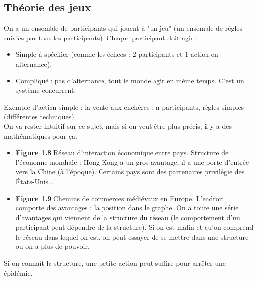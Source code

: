 \subsection{Théorie des jeux}
On a un ensemble de participants qui jouent à "un jeu" (un ensemble de règles suivies par tous les participants). Chaque participant doit agir : 
\begin{itemize}

\item Simple à spécifier (comme les échecs : 2 participants et 1 action en alternance). 
\item Compliqué : pas d'alternance, tout le monde agit en même temps. C'est un système concurrent.
\end{itemize}
Exemple d'action simple : la vente aux enchères : 
	n participants,
	règles simples (différentes techniques) \\
	
On va rester intuitif sur ce sujet, mais si on veut être plus précis, il y a des mathématiques pour ça.
\begin{itemize}

\item \textbf{Figure 1.8} Réseau d'interaction économique entre pays. Structure de l'économie mondiale : Hong Kong a un gros avantage, il a une porte d'entrée vers la Chine (à l'époque). Certains pays sont des partenaires privilégie des États-Unis... 
\item \textbf{Figure 1.9} Chemins de commerces médiévaux en Europe. L'endroit comporte des avantages : la position dans le graphe. On a toute une série d'avantages qui viennent de la structure du réseau (le comportement d'un participant peut dépendre de la structure). Si on est malin et qu'on comprend le réseau dans lequel on est, on peut essayer de se mettre dans une structure ou on a plus de pouvoir. 
\end{itemize}
Si on connaît la structure, une petite action peut suffire pour arrêter une épidémie.
